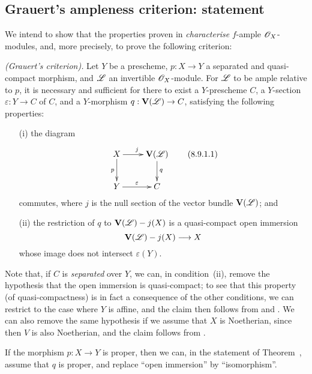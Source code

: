 \subsection{Grauert's ampleness criterion: statement}
\label{subsection:II.8.9}

We intend to show that the properties proven in  \emph{characterise} $f$-ample $\mathscr{O}_X$-modules, and, more precisely, to prove the following criterion:
\begin{theorem}[8.9.1]
\label{II.8.9.1}
\emph{(Grauert's criterion).}
Let $Y$ be a prescheme, $p:X\to Y$ a separated and quasi-compact morphism, and $\mathscr{L}$ an invertible $\mathscr{O}_X$-module.
For $\mathscr{L}$ to be ample relative to $p$, it is necessary and sufficient for there to exist a $Y$-prescheme $C$, a $Y$-section $\varepsilon:Y\to C$ of $C$, and a $Y$-morphism $q:\bb{V}(\sh{L})\to C$, satisfying the following properties:
\begin{enumerate}
  \item[\rm{(i)}] the diagram
    \[
      \label{II.8.9.1.1}
        \xymatrix{
          X
            \ar[r]^{j}
            \ar[d]_{p}
        & \bb{V}(\sh{L})
            \ar[d]^{q}
        \\Y
            \ar[r]^{\varepsilon}
        & C
        }
      \tag{8.9.1.1}
    \]
    commutes, where $j$ is the null section of the vector bundle $\mathbf{V}(\mathscr{L})$; and
  \item[\rm{(ii)}] the restriction of $q$ to $\mathbf{V}(\mathscr{L})- j(X)$ is a quasi-compact open immersion
    \[
      \bb{V}(\sh{L})\setmin j(X)\to X
    \]
    whose image does not intersect $\varepsilon(Y)$.
\end{enumerate}
\end{theorem}

Note that, if $C$ is \emph{separated} over $Y$, we can, in condition~(ii), remove the hypothesis that the open immersion is quasi-compact;
to see that this property (of quasi-compactness) is in fact a consequence of the other conditions, we can restrict to the case where $Y$ is affine, and the claim then follows from  and .
We can also remove
the same hypothesis if we assume that $X$ is Noetherian, since then $V$ is also Noetherian, and the claim follows from .

\begin{corollary}[8.9.2]
\label{II.8.9.2}
If the morphism $p:X\to Y$ is proper, then we can, in the statement of Theorem~, assume that $q$ is proper, and replace ``open immersion'' by ``isomorphism''.
\end{corollary}

